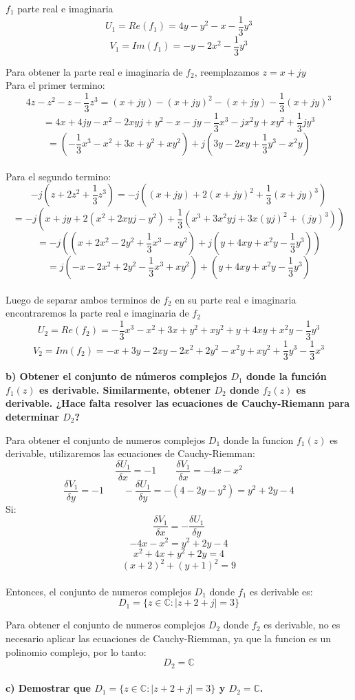 \documentclass[12pt]{report}
\begin{document}
$f_1$ parte real e imaginaria
$$U_1=Re(f_1)=4y-y^2-x-\frac{1}{3}y^3$$
$$V_1=Im(f_1)=-y-2x^2-\frac{1}{3}y^3$$

Para obtener la parte real e imaginaria de $f_2$, reemplazamos $z=x+jy$\\
Para el primer termino:
$$4z - z^2 - z - \frac{1}{3}z^3=(x+jy) - (x+jy)^2 - (x+jy) - \frac{1}{3}(x+jy)^3$$
$$=4x + 4jy -x^2 -2xyj + y^2 -x -jy - \frac{1}{3}x^3 - jx^2y + xy^2 + \frac{1}{3}jy^3$$
$$=(- \frac{1}{3}x^3 -x^2 + 3x + y^2 + xy^2) +j(3y -2xy + \frac{1}{3}y^3 - x^2y )$$ \\
Para el segundo termino:
$$-j (z + 2z^2 + \frac{1}{3}z^3) = -j ((x+jy) + 2(x+jy)^2 + \frac{1}{3}(x+jy)^3)$$
$$=-j (x+jy + 2(x^2+2xyj-y^2) + \frac{1}{3}(x^3 + 3x^2yj + 3x(yj)^2 + (jy)^3))$$
$$=-j ((x + 2x^2 - 2y^2 + \frac{1}{3} x^3 - xy^2) + j( y +4xy + x^2y - \frac{1}{3}y^3))$$
$$=j(-x - 2x^2 + 2y^2 - \frac{1}{3} x^3 + xy^2) + ( y +4xy + x^2y - \frac{1}{3}y^3)$$\\
Luego de separar ambos terminos de $f_2$ en su parte real e imaginaria encontraremos la parte real
e imaginaria de $f_2$
$$U_2=Re(f_2)=- \frac{1}{3}x^3 - x^2 + 3x + y^2 + xy^2 + y +4xy + x^2y - \frac{1}{3}y^3$$
$$V_2=Im(f_2)=-x + 3y -2xy - 2x^2 + 2y^2 - x^2y + xy^2 + \frac{1}{3}y^3 - \frac{1}{3} x^3$$

\textbf{b) Obtener el conjunto de números complejos $D_1$ donde la función $f_1(z)$ es derivable. Similarmente, obtener $D_2$ donde $f_2(z)$ es derivable.
¿Hace falta resolver las ecuaciones de Cauchy-Riemann para determinar $D_2$?}

Para obtener el conjunto de numeros complejos $D_1$ donde la funcion $f_1(z)$ es derivable, utilizaremos las ecuaciones de Cauchy-Riemman:
$$\frac{\delta U_1}{\delta x}=-1 \quad \quad \frac{\delta V_1}{\delta x}=-4x-x^2$$
$$\frac{\delta V_1}{\delta y}=-1 \quad \quad - \frac{\delta U_1}{\delta y}=-(4-2y-y^2)=y^2+2y-4$$
Si:$$\frac{\delta V_1}{\delta x}=-\frac{\delta U_1}{\delta y}$$
$$-4x-x^2=y^2+2y-4$$
$$x^2+4x+y^2+2y=4$$
$$(x+2)^2+(y+1)^2=9$$\\
Entonces, el conjunto de numeros complejos $D_1$ donde $f_1$ es derivable es:
$$D_1 = \{z \in \mathbb{C} : |z + 2 + j| = 3\}$$

Para obtener el conjunto de numeros complejos $D_2$ donde $f_2$ es derivable, no es necesario aplicar las ecuaciones de Cauchy-Riemman,
ya que la funcion es un polinomio complejo, por lo tanto:
$$D_2=\mathbb{C}$$\\

\textbf{c) Demostrar que $D_1 = \{z \in \mathbb{C} : |z + 2 + j| = 3\}$ y $D_2 = \mathbb{C}$.}
\end{document}
